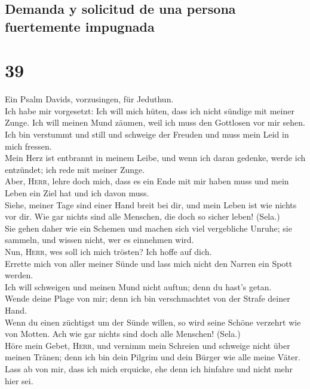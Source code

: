 \hypertarget{demanda-y-solicitud-de-una-persona-fuertemente-impugnada}{%
\subsection{Demanda y solicitud de una persona fuertemente
impugnada}\label{demanda-y-solicitud-de-una-persona-fuertemente-impugnada}}

\hypertarget{section-38}{%
\section{39}\label{section-38}}

 Ein Psalm Davids, vorzusingen, für Jeduthun.\\
 Ich habe mir vorgesetzt: Ich will mich hüten, dass ich
nicht sündige mit meiner Zunge. Ich will meinen Mund zäumen, weil ich
muss den Gottlosen vor mir sehen.\\
 Ich bin verstummt und still und schweige der Freuden und
muss mein Leid in mich fressen.\\
 Mein Herz ist entbrannt in meinem Leibe, und wenn ich
daran gedenke, werde ich entzündet; ich rede mit meiner Zunge.\\
 Aber, \textsc{Herr}, lehre doch mich, dass es ein Ende
mit mir haben muss und mein Leben ein Ziel hat und ich davon muss.\\
 Siehe, meiner Tage sind einer Hand breit bei dir, und
mein Leben ist wie nichts vor dir. Wie gar nichts sind alle Menschen,
die doch so sicher leben! (Sela.)\\
 Sie gehen daher wie ein Schemen und machen sich viel
vergebliche Unruhe; sie sammeln, und wissen nicht, wer es einnehmen
wird.\\
 Nun, \textsc{Herr}, wes soll ich mich trösten? Ich hoffe
auf dich.\\
 Errette mich von aller meiner Sünde und lass mich nicht
den Narren ein Spott werden.\\
 Ich will schweigen und meinen Mund nicht auftun; denn du
hast's getan.\\
 Wende deine Plage von mir; denn ich bin verschmachtet
von der Strafe deiner Hand.\\
 Wenn du einen züchtigst um der Sünde willen, so wird
seine Schöne verzehrt wie von Motten. Ach wie gar nichts sind doch alle
Menschen! (Sela.)\\
 Höre mein Gebet, \textsc{Herr}, und vernimm mein
Schreien und schweige nicht über meinen Tränen; denn ich bin dein
Pilgrim und dein Bürger wie alle meine Väter.\\
 Lass ab von mir, dass ich mich erquicke, ehe denn ich
hinfahre und nicht mehr hier sei.

